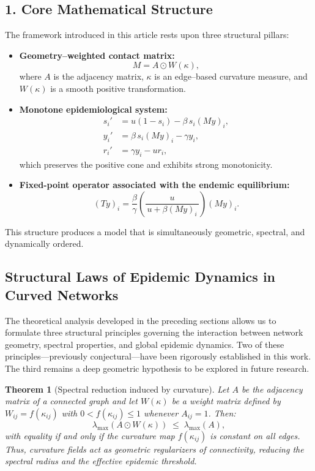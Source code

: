 \documentclass[final,3p,times,twocolumn]{elsarticle}
\newtheorem{theorem}{Theorem}
\begin{document}
\subsection{1. Core Mathematical Structure}

The framework introduced in this article rests upon three structural pillars:

\begin{itemize}[label=--]
    \item[(i)] \textbf{Geometry–weighted contact matrix:}
    \[
        M = A \odot W(\kappa),
    \]
    where $A$ is the adjacency matrix, $\kappa$ is an edge–based curvature
    measure, and $W(\kappa)$ is a smooth positive transformation.

    \item[(ii)] \textbf{Monotone epidemiological system:}
    \[
    \begin{aligned}
    s_i' &= u(1 - s_i) - \beta\, s_i (My)_i,\\
    y_i' &= \beta\, s_i (My)_i - \gamma y_i,\\
    r_i' &= \gamma y_i - u r_i,
    \end{aligned}
    \]
    which preserves the positive cone and exhibits strong monotonicity.

    \item[(iii)] \textbf{Fixed-point operator associated with the endemic equilibrium:}
    \[
        (Ty)_i
        =
        \frac{\beta}{\gamma}
        \left(\frac{u}{\,u + \beta (My)_i\,}\right)
        (My)_i.
    \]
\end{itemize}

This structure produces a model that is simultaneously geometric, spectral, and
dynamically ordered.

\subsection{Structural Laws of Epidemic Dynamics in Curved Networks}

The theoretical analysis developed in the preceding sections allows us to
formulate three structural principles governing the interaction between network
geometry, spectral properties, and global epidemic dynamics. Two of these
principles---previously conjectural---have been rigorously established in this
work. The third remains a deep geometric hypothesis to be explored in future
research.

\begin{theorem}[Spectral reduction induced by curvature]
\label{thm:spectralreduction}
Let $A$ be the adjacency matrix of a connected graph and let
$W(\kappa)$ be a weight matrix defined by $W_{ij}=f(\kappa_{ij})$ with
$0 < f(\kappa_{ij}) \le 1$ whenever $A_{ij}=1$. Then:
\[
    \lambda_{\max}(A \odot W(\kappa))
    \;\le\;
    \lambda_{\max}(A),
\]
with equality if and only if the curvature map $f(\kappa_{ij})$ is constant on
all edges. Thus, curvature fields act as geometric regularizers of connectivity,
reducing the spectral radius and the effective epidemic threshold.
\end{theorem}
\end{document}
